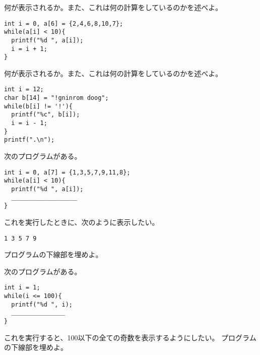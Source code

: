 \documentclass[12pt,a4j]{jarticle}
\newcounter{toi}
\def\toi{%
\bigskip\bigskip\noindent
\addtocounter{toi}{1}
\shadowbox{\bfseries\large 問\thetoi}
\nopagebreak[4]\bigskip\nopagebreak[4]
}
\begin{document}




\toi

何が表示されるか。また、これは何の計算をしているのかを述べよ。
\begin{verbatim}
int i = 0, a[6] = {2,4,6,8,10,7};
while(a[i] < 10){
  printf("%d ", a[i]);
  i = i + 1;
}
\end{verbatim}




\toi

何が表示されるか。また、これは何の計算をしているのかを述べよ。
\begin{verbatim}
int i = 12;
char b[14] = "!gninrom doog";
while(b[i] != '!'){
  printf("%c", b[i]);
  i = i - 1;
}
printf(".\n");
\end{verbatim}





\toi

次のプログラムがある。
\begin{verbatim}
int i = 0, a[7] = {1,3,5,7,9,11,8};
while(a[i] < 10){
  printf("%d ", a[i]);
  ＿＿＿＿＿＿＿＿＿＿＿
}
\end{verbatim}
これを実行したときに、次のように表示したい。
\begin{verbatim}
1 3 5 7 9
\end{verbatim}
プログラムの下線部を埋めよ。





\toi

次のプログラムがある。
\begin{verbatim}
int i = 1;
while(i <= 100){
  printf("%d ", i);
  ＿＿＿＿＿＿＿＿＿
}
\end{verbatim}
これを実行すると、100以下の全ての奇数を表示するようにしたい。
プログラムの下線部を埋めよ。
\end{document}
